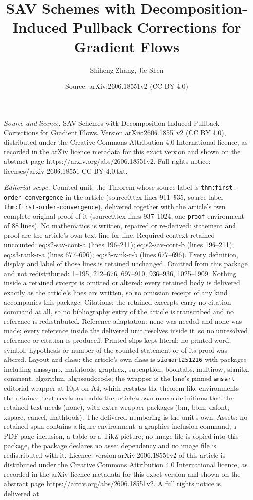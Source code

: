 \documentclass[10pt,a4paper]{amsart}
\title[SAV Schemes with Decomposition-Induced Pullback Corrections ]{SAV Schemes with Decomposition-Induced Pullback Corrections for Gradient Flows}
\author{Shiheng Zhang, Jie Shen}
\date{Source: arXiv:2606.18551v2 (CC BY 4.0)}
\begin{document}
\maketitle

\noindent\emph{Source and licence.} SAV Schemes with Decomposition-Induced Pullback Corrections for Gradient Flows. Version arXiv:2606.18551v2 (CC BY 4.0), distributed under the Creative Commons Attribution 4.0 International licence, as recorded in the arXiv licence metadata for this exact version and shown on the abstract page https://arxiv.org/abs/2606.18551v2. Full rights notice: licenses/arxiv-2606.18551-CC-BY-4.0.txt.\par\smallskip

\noindent\textit{Editorial scope.} Counted unit: the Theorem whose source label is \texttt{thm:first-order-convergence} in the article (source0.tex lines 911--935, source label \texttt{thm:first-order-convergence}), delivered together with the article's own complete original proof of it (source0.tex lines 937--1024, one \texttt{proof} environment of 88 lines). No mathematics is written, repaired or re-derived: statement and proof are the article's own text line for line. Required context retained uncounted: eq:s2-sav-cont-a (lines 196--211); eq:s2-sav-cont-b (lines 196--211); eq:s3-rank-r-a (lines 677--696); eq:s3-rank-r-b (lines 677--696). Every definition, display and label of those lines is retained unchanged. Omitted from this package and not redistributed: 1--195, 212--676, 697--910, 936--936, 1025--1909. Nothing inside a retained excerpt is omitted or altered: every retained body is delivered exactly as the article's lines are written, so no omission receipt of any kind accompanies this package. Citations: the retained excerpts carry no citation command at all, so no bibliography entry of the article is transcribed and no reference is redistributed. Reference adaptation: none was needed and none was made; every reference inside the delivered unit resolves inside it, so no unresolved reference or citation is produced. Printed slips kept literal: no printed word, symbol, hypothesis or number of the counted statement or of its proof was altered. Layout and class: the article's own class is \texttt{siamart251216} with packages including amssymb, mathtools, graphicx, subcaption, booktabs, multirow, siunitx, comment, algorithm, algpseudocode; the wrapper is the lane's pinned \texttt{amsart} editorial wrapper at 10pt on A4, which restates the theorem-like environments the retained text needs and adds the article's own macro definitions that the retained text needs (none), with extra wrapper packages (bm, bbm, dsfont, xspace, cancel, mathtools). The delivered numbering is the unit's own. Assets: no retained span contains a figure environment, a graphics-inclusion command, a PDF-page inclusion, a table or a TikZ picture; no image file is copied into this package, the package declares no asset dependency and no image file is redistributed with it. Licence: version arXiv:2606.18551v2 of this article is distributed under the Creative Commons Attribution 4.0 International licence, as recorded in the arXiv licence metadata for this exact version and shown on the abstract page https://arxiv.org/abs/2606.18551v2. A full rights notice is delivered at 
\end{document}
